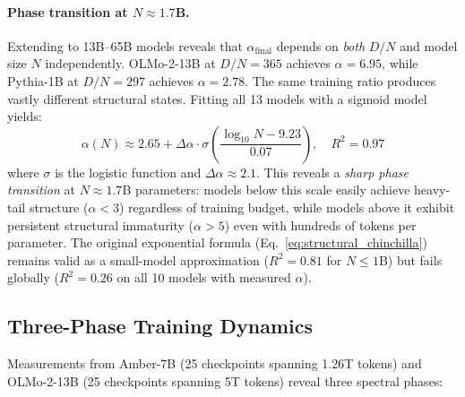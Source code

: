 \paragraph{Phase transition at $N \approx 1.7$B.} Extending to 13B--65B models reveals that $\alpha_{\mathrm{final}}$ depends on \emph{both} $D/N$ and model size $N$ independently. OLMo-2-13B at $D/N = 365$ achieves $\alpha = 6.95$, while Pythia-1B at $D/N = 297$ achieves $\alpha = 2.78$. The same training ratio produces vastly different structural states. Fitting all 13 models with a sigmoid model yields:
\begin{equation}
    \alpha(N) \approx 2.65 + \Delta\alpha \cdot \sigma\!\left(\frac{\log_{10} N - 9.23}{0.07}\right), \quad R^2 = 0.97
\end{equation}
where $\sigma$ is the logistic function and $\Delta\alpha \approx 2.1$. This reveals a \emph{sharp phase transition} at $N \approx 1.7$B parameters: models below this scale easily achieve heavy-tail structure ($\alpha < 3$) regardless of training budget, while models above it exhibit persistent structural immaturity ($\alpha > 5$) even with hundreds of tokens per parameter. The original exponential formula (Eq.~\ref{eq:structural_chinchilla}) remains valid as a small-model approximation ($R^2 = 0.81$ for $N \leq 1$B) but fails globally ($R^2 = 0.26$ on all 10 models with measured $\alpha$).

\subsection{Three-Phase Training Dynamics}
\label{sec:phases}

Measurements from Amber-7B (25 checkpoints spanning 1.26T tokens) and OLMo-2-13B (25 checkpoints spanning 5T tokens) reveal three spectral phases:

